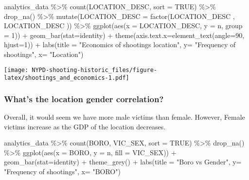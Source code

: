 \documentclass[
]{article}
\newenvironment{Shaded}{\begin{snugshade}}{\end{snugshade}}
\newcommand{\AttributeTok}[1]{\textcolor[rgb]{0.77,0.63,0.00}{#1}}
\newcommand{\ConstantTok}[1]{\textcolor[rgb]{0.00,0.00,0.00}{#1}}
\newcommand{\DecValTok}[1]{\textcolor[rgb]{0.00,0.00,0.81}{#1}}
\newcommand{\FunctionTok}[1]{\textcolor[rgb]{0.00,0.00,0.00}{#1}}
\newcommand{\NormalTok}[1]{#1}
\newcommand{\SpecialCharTok}[1]{\textcolor[rgb]{0.00,0.00,0.00}{#1}}
\newcommand{\StringTok}[1]{\textcolor[rgb]{0.31,0.60,0.02}{#1}}
\begin{document}
\begin{Shaded}
\begin{Highlighting}[]
\NormalTok{analytics\_data }\SpecialCharTok{\%\textgreater{}\%} \FunctionTok{count}\NormalTok{(LOCATION\_DESC, }\AttributeTok{sort =} \ConstantTok{TRUE}\NormalTok{) }\SpecialCharTok{\%\textgreater{}\%} \FunctionTok{drop\_na}\NormalTok{() }\SpecialCharTok{\%\textgreater{}\%} \FunctionTok{mutate}\NormalTok{(}\AttributeTok{LOCATION\_DESC =} \FunctionTok{factor}\NormalTok{(LOCATION\_DESC , LOCATION\_DESC )) }\SpecialCharTok{\%\textgreater{}\%} \FunctionTok{ggplot}\NormalTok{(}\FunctionTok{aes}\NormalTok{(}\AttributeTok{x =}\NormalTok{ LOCATION\_DESC, }\AttributeTok{y =}\NormalTok{ n, }\AttributeTok{group =} \DecValTok{1}\NormalTok{)) }\SpecialCharTok{+} \FunctionTok{geom\_bar}\NormalTok{(}\AttributeTok{stat=}\StringTok{\textquotesingle{}identity\textquotesingle{}}\NormalTok{) }\SpecialCharTok{+} \FunctionTok{theme}\NormalTok{(}\AttributeTok{axis.text.x=}\FunctionTok{element\_text}\NormalTok{(}\AttributeTok{angle=}\DecValTok{90}\NormalTok{, }\AttributeTok{hjust=}\DecValTok{1}\NormalTok{)) }\SpecialCharTok{+} \FunctionTok{labs}\NormalTok{(}\AttributeTok{title =} \StringTok{"Economics of shootings location"}\NormalTok{, }\AttributeTok{y=} \StringTok{"Frequency of shootings"}\NormalTok{, }\AttributeTok{x=} \StringTok{"Location"}\NormalTok{)}
\end{Highlighting}
\end{Shaded}

\texttt{[image: NYPD-shooting-historic\_files/figure-latex/shootings\_and\_economics-1.pdf]}

\hypertarget{whats-the-location-gender-correlation}{%
\subsubsection{What's the location gender
correlation?}\label{whats-the-location-gender-correlation}}

Overall, it would seem we have more male victims than female. However,
Female victims increase as the GDP of the location decreases.

\begin{Shaded}
\begin{Highlighting}[]
\NormalTok{analytics\_data }\SpecialCharTok{\%\textgreater{}\%} \FunctionTok{count}\NormalTok{(BORO, VIC\_SEX, }\AttributeTok{sort =} \ConstantTok{TRUE}\NormalTok{) }\SpecialCharTok{\%\textgreater{}\%} \FunctionTok{drop\_na}\NormalTok{() }\SpecialCharTok{\%\textgreater{}\%} \FunctionTok{ggplot}\NormalTok{(}\FunctionTok{aes}\NormalTok{(}\AttributeTok{x =}\NormalTok{ BORO, }\AttributeTok{y =}\NormalTok{ n, }\AttributeTok{fill =}\NormalTok{ VIC\_SEX)) }\SpecialCharTok{+} \FunctionTok{geom\_bar}\NormalTok{(}\AttributeTok{stat=}\StringTok{\textquotesingle{}identity\textquotesingle{}}\NormalTok{) }\SpecialCharTok{+} \FunctionTok{theme\_grey}\NormalTok{() }\SpecialCharTok{+} \FunctionTok{labs}\NormalTok{(}\AttributeTok{title =} \StringTok{"Boro vs Gender"}\NormalTok{, }\AttributeTok{y=} \StringTok{"Frequency of shootings"}\NormalTok{, }\AttributeTok{x=} \StringTok{"BORO"}\NormalTok{)}
\end{Highlighting}
\end{Shaded}
\end{document}

